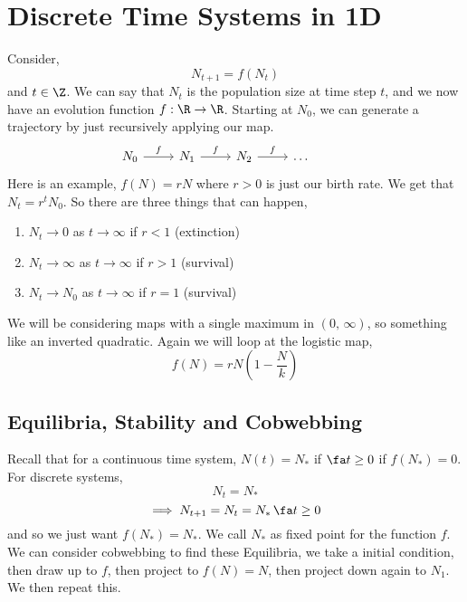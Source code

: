 
\section{Discrete Time Systems in 1D}
Consider,
$$ N_{t+1} = f(N_t) $$
 and $t \in \Z$. We can say that $N_t$ is the population size at time step $t$, and we now have an evolution function $f: \R \to \R$. Starting at $N_0$, we can generate a trajectory by just recursively applying our map.
 \[\begin{tikzcd}
	{N_0} & {N_1} & {N_2} & \dots & {}
	\arrow["f", from=1-1, to=1-2]
	\arrow["f", from=1-2, to=1-3]
	\arrow["f", from=1-3, to=1-4]
\end{tikzcd}\]
Here is an example, $f(N) = rN$ where $r > 0$ is just our birth rate. We get that $N_t = r^tN_0$. So there are three things that can happen,
\begin{enumerate}
  \item $N_t \to 0$ as $t \to \infty$ if $r < 1$ (extinction)
  \item $N_t \to \infty$ as $t \to \infty$ if $r > 1$ (survival)
  \item $N_t \to N_0$ as $t \to \infty$ if $r = 1$ (survival)
\end{enumerate}

We will be considering maps with a single maximum in $(0,\,\infty)$, so something like an inverted quadratic. Again we will loop at the logistic map,
$$ f(N) = rN\left( 1 - \frac{N}{k} \right) $$

\subsection{Equilibria, Stability and Cobwebbing}
Recall that for a continuous time system, $N(t) = N_{*}$ if $\fa t\ge 0$ if $f(N_*) = 0$. For discrete systems,
$$ N_t = N_* $$
$$ \implies N_{t+1} = N_t = N_* \,\fa t \ge 0$$
and so we just want $f(N_*) = N_*$. We call $N_*$ as fixed point for the function $f$.\\

We can consider cobwebbing to find these Equilibria, we take a initial condition, then draw up to $f$, then project to $f(N) = N$, then project down again to $N_1$. We then repeat this.



